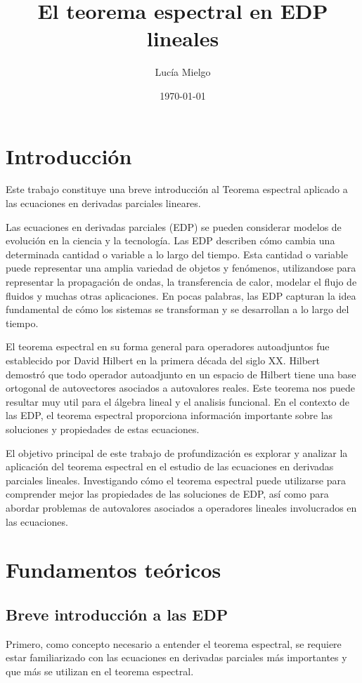 \documentclass{article}
\title {\huge \textbf{El teorema espectral en EDP lineales}}
\author{Lucía Mielgo}
\date{\today}
\begin{document}
\maketitle %
\newpage

\renewcommand{\contentsname}{Índice} 
\tableofcontents
\newpage
\section{Introducción}
Este trabajo constituye una breve introducción al Teorema espectral aplicado a las ecuaciones en derivadas parciales lineares.

Las ecuaciones en derivadas parciales (EDP) se pueden considerar modelos de evolución en la ciencia y la tecnología. Las EDP describen cómo cambia una determinada cantidad o variable a lo largo del tiempo. Esta cantidad o variable puede representar una amplia variedad de objetos y fenómenos, utilizandose para representar la propagación de ondas, la transferencia de calor, modelar el flujo de fluidos y muchas otras aplicaciones. En pocas palabras, las EDP capturan la idea fundamental de cómo los sistemas se transforman y se desarrollan a lo largo del tiempo.

El teorema espectral en su forma general para operadores autoadjuntos fue establecido por David Hilbert en la primera década del siglo XX. Hilbert demostró que todo operador autoadjunto en un espacio de Hilbert tiene una base ortogonal de autovectores asociados a autovalores reales.
Este teorema nos puede resultar muy util para el álgebra lineal y el analisis funcional. En el contexto de las EDP, el teorema espectral proporciona información importante sobre las soluciones y propiedades de estas ecuaciones.

El objetivo principal de este trabajo de profundización es explorar y analizar la aplicación del teorema espectral en el estudio de las ecuaciones en derivadas parciales lineales. Investigando cómo el teorema espectral puede utilizarse para comprender mejor las propiedades de las soluciones de EDP, así como para abordar problemas de autovalores asociados a operadores lineales involucrados en las ecuaciones.

\newpage

\section{Fundamentos teóricos}
    \subsection{Breve introducción a las EDP}
    Primero, como concepto necesario a entender el teorema espectral, se requiere estar familiarizado con las ecuaciones en derivadas parciales más importantes y que más se utilizan en el teorema espectral.
\end{document}
